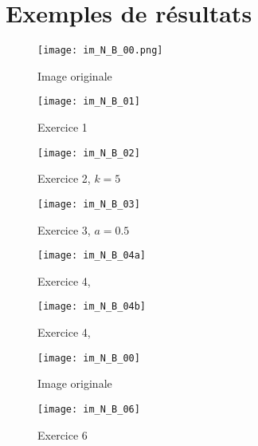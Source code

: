 \section{Exemples de résultats}
\begin{figure}[!h]
\centering
\begin{minipage}{0.45\textwidth}
\centering
\texttt{[image: im\_N\_B\_00.png]}
\caption{Image originale}
\end{minipage}\hfill
\begin{minipage}{0.45\textwidth}
\centering
\texttt{[image: im\_N\_B\_01]}
\caption{Exercice 1}
\end{minipage}
\end{figure}
\begin{figure}[!h]
\centering
\begin{minipage}{0.45\textwidth}
\centering
\texttt{[image: im\_N\_B\_02]}
\caption{Exercice 2, $k=5$}
\end{minipage}\hfill
\begin{minipage}{0.45\textwidth}
\centering
\texttt{[image: im\_N\_B\_03]}
\caption{Exercice 3, $a = 0.5$}
\end{minipage}
\end{figure}
\begin{figure}[!h]
\centering
\begin{minipage}{0.45\textwidth}
\centering
\texttt{[image: im\_N\_B\_04a]}
\caption{Exercice 4, }
\end{minipage}\hfill
\begin{minipage}{0.45\textwidth}
\centering
\texttt{[image: im\_N\_B\_04b]}
\caption{Exercice 4, }
\end{minipage}
\end{figure}
\newpage
\begin{figure}[!h]
\centering
\begin{minipage}{0.45\textwidth}
\centering
\texttt{[image: im\_N\_B\_00]}
\caption{Image originale}
\end{minipage}\hfill
\begin{minipage}{0.45\textwidth}
\centering
\texttt{[image: im\_N\_B\_06]}
\caption{Exercice 6}
\end{minipage}
\end{figure}
